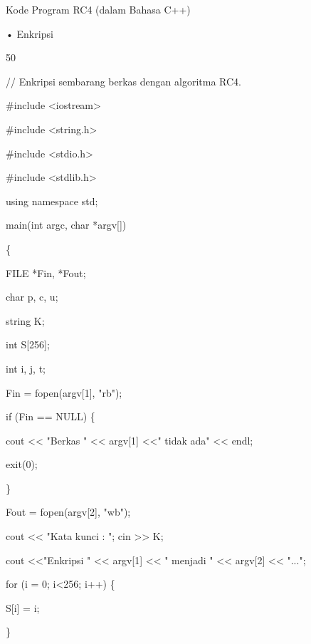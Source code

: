 \documentclass{article}
\begin{document}

Kode Program RC4 (dalam Bahasa C++)

• Enkripsi

50

// Enkripsi sembarang berkas dengan algoritma RC4.

\#include <iostream>

\#include <string.h>

\#include <stdio.h>

\#include <stdlib.h>

using namespace std;

main(int argc, char *argv[])

\{

 FILE *Fin, *Fout;

 char p, c, u;

 string K;

 int S[256];

 int i, j, t; 


Fin = fopen(argv[1], "rb");

 if (Fin == NULL) \{

   cout << "Berkas " << argv[1] <<" tidak ada" << endl;

   exit(0);

 \}


 Fout = fopen(argv[2], "wb");

 cout << "Kata kunci : "; cin >> K; 

 cout <<"Enkripsi " << argv[1] << " menjadi " << argv[2] << "..."; 


 for (i = 0; i<256; i++) \{

  S[i] = i;

 \}
\end{document}
